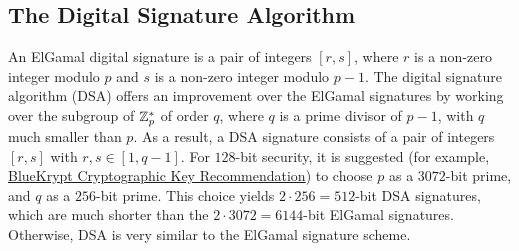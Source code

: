 \subsection{The Digital Signature Algorithm}
An ElGamal digital signature is a pair of integers $[r, s]$, where $r$ is a 
non-zero integer modulo $p$ and $s$ is a non-zero integer modulo $p-1$. The 
digital signature algorithm (DSA) offers an improvement over the ElGamal signatures 
by working over the subgroup of $\mathbb{Z}_p^*$ of order $q$, where $q$ is a prime 
divisor of $p-1$, with $q$ much smaller than $p$. As a result, a DSA signature 
consists of a pair of integers $[r, s]$ with $r, s \in [1, q-1]$. For $128$-bit 
security, it is suggested (for example, \href{https://www.keylength.com/en/4/}
{BlueKrypt Cryptographic Key Recommendation}) to choose $p$ as a $3072$-bit prime, 
and $q$ as a $256$-bit prime. This choice yields $2 \cdot 256 = 512$-bit DSA 
signatures, which are much shorter than the $2 \cdot 3072 = 6144$-bit ElGamal 
signatures. Otherwise, DSA is very similar to the ElGamal signature scheme. 
